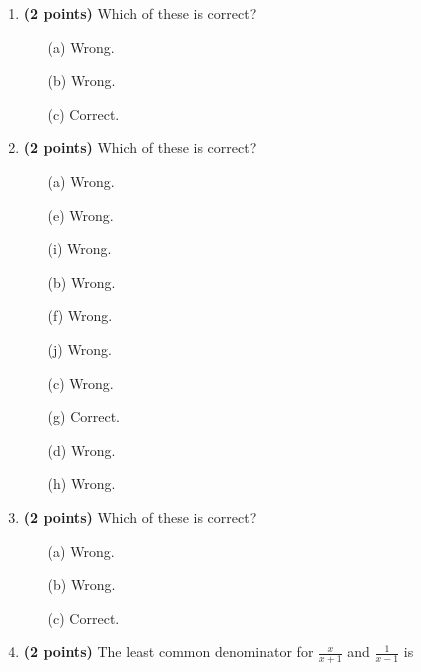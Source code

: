 \documentclass[12pt]{amsart}
\begin{document}
\newpage
\begin{enumerate}
\item {\bf (2 points)} 
 Which of these is correct?

\begin{minipage}[t]{1.0\linewidth}\begin{multicols}{3}\begin{itemize}\item[(a)]  Wrong. \item[(b)]  Wrong. \item[(c)]  Correct. \end{itemize}\end{multicols}\end{minipage} \vfill 
\item {\bf (2 points)} 
 Which of these is correct?

\begin{minipage}[t]{1.0\linewidth}\begin{multicols}{4}\begin{itemize}\item[(a)]  Wrong. \item[(e)]  Wrong. \item[(i)]  Wrong. \item[(b)]  Wrong. \item[(f)]  Wrong. \item[(j)]  Wrong. \item[(c)]  Wrong. \item[(g)]  Correct. \item[] \item[(d)]  Wrong. \item[(h)]  Wrong. \item[] \end{itemize}\end{multicols}\end{minipage} \vfill 
\item {\bf (2 points)} 
 Which of these is correct?

\begin{minipage}[t]{1.0\linewidth}\begin{multicols}{3}\begin{itemize}\item[(a)]  Wrong. \item[(b)]  Wrong. \item[(c)]  Correct. \end{itemize}\end{multicols}\end{minipage} \vfill 
\item {\bf (2 points)} 
 The least common denominator for $\displaystyle \frac{x}{x+1}$ and $\displaystyle \frac{1}{x-1}$ is \vspace{.2cm}


\end{enumerate}
\end{document}
